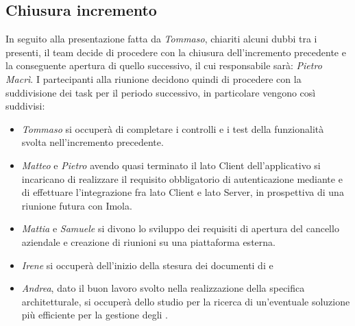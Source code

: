 \subsection{Chiusura incremento}
In seguito alla presentazione fatta da \textit{Tommaso}, chiariti alcuni dubbi tra i presenti, il team decide di procedere con la chiusura dell'incremento precedente e la conseguente apertura di quello successivo, il cui responsabile sarà: \textit{Pietro Macrì}. \newline
I partecipanti alla riunione decidono quindi di procedere con la suddivisione dei task per il periodo successivo, in particolare vengono così suddivisi:
  \begin{itemize}
    \item \textit{Tommaso} si occuperà di completare i controlli e i test della funzionalità svolta nell'incremento precedente.
    \item \textit{Matteo} e \textit{Pietro} avendo quasi terminato il lato Client dell'applicativo si incaricano di realizzare il requisito obbligatorio di autenticazione mediante  e di effettuare l'integrazione fra lato Client e lato Server, in prospettiva di una riunione futura con Imola.
    \item \textit{Mattia} e \textit{Samuele} si divono lo sviluppo dei requisiti di apertura del cancello aziendale e creazione di riunioni su una piattaforma esterna. 
    \item \textit{Irene} si occuperà dell'inizio della stesura dei documenti di  e 
    \item \textit{Andrea}, dato il buon lavoro svolto nella realizzazione della specifica architetturale, si occuperà dello studio per la ricerca di un'eventuale  soluzione più efficiente per la gestione degli .
  \end{itemize}
\newpage
